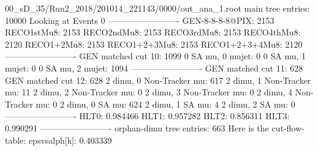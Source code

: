 00_sD_35/Run2_2018/201014_221143/0000/out_ana_1.root
main tree entries: 10000
Looking at Events 0
-------------------------
GEN-8-8-8-8@PIX: 2153
RECO1stMu8: 2153
RECO2ndMu8: 2153
RECO3rdMu8: 2153
RECO4thMu8: 2120
RECO1+2Mu8: 2153
RECO1+2+3Mu8: 2153
RECO1+2+3+4Mu8: 2120
-------------------------
GEN matched cut 10: 1099
0 SA mu, 0 mujet: 0
0 SA mu, 1 mujet: 0
0 SA mu, 2 mujet: 1094
-------------------------
GEN matched cut 11: 628
GEN matched cut 12: 628
2 dimu, 0 Non-Tracker mu: 617
2 dimu, 1 Non-Tracker mu: 11
2 dimu, 2 Non-Tracker mu: 0
2 dimu, 3 Non-Tracker mu: 0
2 dimu, 4 Non-Tracker mu: 0
2 dimu, 0 SA mu: 624
2 dimu, 1 SA mu: 4
2 dimu, 2 SA mu: 0
-------------------------
HLT0: 0.984466
HLT1: 0.957282
HLT2: 0.856311
HLT3: 0.990291
-------------------------
orphan-dimu tree entries: 663
Here is the cut-flow-table:
epsvsalph[k]: 0.403339
        

